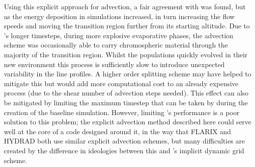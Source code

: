 Using this explicit approach for advection, a fair agreement with \Radyn{} was found, but as the energy deposition in simulations increased, in turn increasing the flow speeds and moving the transition region further from its starting altitude.
Due to \Radyn{}'s longer timesteps, during more explosive evaporative phases, the advection scheme was occasionally able to carry chromospheric material through the majority of the transition region.
Whilst the populations quickly evolved in their new environment this process is sufficiently slow to introduce unexpected variability in the line profiles.
A higher order splitting scheme may have helped to mitigate this but would add more computational cost to an already expensive process (due to the shear number of advection steps needed).
This effect can also be mitigated by limiting the maximum timestep that can be taken by \Radyn{} during the creation of the baseline simulation.
However, limiting \Radyn{}'s performance is a poor solution to this problem; the explicit advection method described here could serve well at the core of a code designed around it, in the way that FLARIX and HYDRAD both use similar explicit advection schemes, but many difficulties are created by the difference in ideologies between this and \Radyn{}'s implicit dynamic grid scheme.

